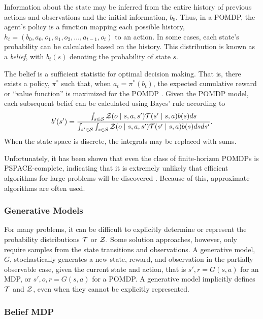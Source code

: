 Information about the state may be inferred from the entire history of previous actions and observations and the initial information, $b_0$.
Thus, in a POMDP, the agent's policy is a function mapping each possible history, $h_t = (b_0, a_0, o_1, a_1, o_2, \dots, a_{t-1}, o_t)$ to an action.
In some cases, each state's probability can be calculated based on the history.
This distribution is known as a \emph{belief}, with $b_t(s)$ denoting the probability of state $s$.

The belief is a sufficient statistic for optimal decision making.
That is, there exists a policy, $\pi^*$ such that, when $a_t = \pi^*(b_t)$, the expected cumulative reward or ``value function'' is maximized for the POMDP \cite{kaelbling1998planning,kochenderfer2015decision}.
Given the POMDP model, each subsequent belief can be calculated using Bayes' rule according to
\begin{equation} \label{eqn:update}
    b'(s') = \frac{\int_{s\in\mathcal{S}} \mathcal{Z}(o \mid s, a, s') \mathcal{T}(s' \mid s, a) b(s) ds}
    {\int_{s'\in\mathcal{S}} \int_{s\in\mathcal{S}} \mathcal{Z}(o \mid s, a, s') \mathcal{T}(s' \mid s, a) b(s) ds ds'} \text{.}
\end{equation}
When the state space is discrete, the integrals may be replaced with sums.

Unfortunately, it has been shown that even the class of finite-horizon POMDPs is PSPACE-complete, indicating that it is extremely unlikely that efficient algorithms for large problems will be discovered \cite{papadimitriou1987complexity}.
Because of this, approximate algorithms are often used.

\subsubsection{Generative Models}

For many problems, it can be difficult to explicitly determine or represent the probability distributions $\mathcal{T}$ or $\mathcal{Z}$.
Some solution approaches, however, only require samples from the state transitions and observations.
A generative model, $G$, stochastically generates a new state, reward, and observation in the partially observable case, given the current state and action, that is $s', r = G(s,a)$ for an MDP, or $s', o, r = G(s, a)$ for a POMDP.
A generative model implicitly defines $\mathcal{T}$ and $\mathcal{Z}$, even when they cannot be explicitly represented.

\subsubsection{Belief MDP}

